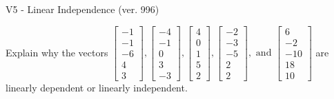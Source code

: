 \begin{exercise}
  \begin{exerciseTitle}V5 - Linear Independence (ver. 996)\end{exerciseTitle}
  \begin{exerciseStatement}
    Explain why the vectors \(\left[\begin{array}{r}
-1 \\
-1 \\
-6 \\
4 \\
3
\end{array}\right] , \left[\begin{array}{r}
-4 \\
-1 \\
0 \\
3 \\
-3
\end{array}\right] , \left[\begin{array}{r}
4 \\
0 \\
1 \\
5 \\
2
\end{array}\right] , \left[\begin{array}{r}
-2 \\
-3 \\
-5 \\
2 \\
2
\end{array}\right] , \text{ and } \left[\begin{array}{r}
6 \\
-2 \\
-10 \\
18 \\
10
\end{array}\right]\) are linearly dependent or linearly independent.	



\end{exerciseStatement}
\end{exercise}
